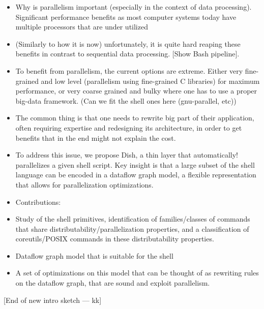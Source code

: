 \documentclass[sigplan,10pt,review,anonymous]{acmart}
\newcommand{\kk}[1]{[{\color{magenta}#1 --- kk}]}
\begin{document}
\begin{itemize}
\item Why is parallelism important (especially in the context of data
  processing). Significant performance benefits as most computer
  systems today have multiple processors that are under utilized
\item (Similarly to how it is now) unfortunately, it is quite hard
  reaping these benefits in contrast to sequential data
  processing. [Show Bash pipeline].
\item To benefit from parallelism, the current options are
  extreme. Either very fine-grained and low level (parallelism using
  fine-grained C libraries) for maximum performance, or very coarse
  grained and bulky where one has to use a proper big-data
  framework. (Can we fit the shell ones here (gnu-parallel, etc))
\item The common thing is that one needs to rewrite big part of their
  application, often requiring expertise and redesigning its
  architecture, in order to get benefits that in the end might not
  explain the cost.
\item To address this issue, we propose Dish, a thin layer that
  automatically! parallelizes a given shell script. Key insight is
  that a large subset of the shell language can be encoded in a
  dataflow graph model, a flexible representation that allows for
  parallelization optimizations.
\item Contributions:
\item Study of the shell primitives, identification of
  families/classes of commands that share
  distributability/parallelization properties, and a classification of
  coreutils/POSIX commands in these distributability properties.
\item Dataflow graph model that is suitable for the shell
\item A set of optimizations on this model that can be thought of as
  rewriting rules on the dataflow graph, that are sound and exploit
  parallelism.
\end{itemize}

\kk{End of new intro sketch}

% 
\end{document}
